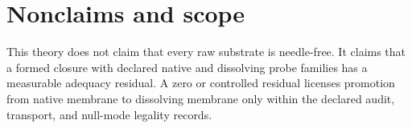 \documentclass[11pt]{article}
\begin{document}
\section{Nonclaims and scope}
This theory does not claim that every raw substrate is needle-free.  It claims
that a formed closure with declared native and dissolving probe families has a
measurable adequacy residual.  A zero or controlled residual licenses promotion
from native membrane to dissolving membrane only within the declared audit,
transport, and null-mode legality records.

\begin{center}
\end{center}
\end{document}
